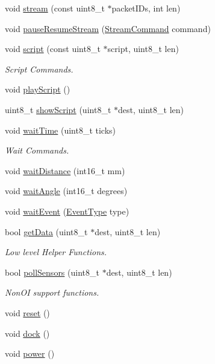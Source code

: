 \begin{DoxyCompactItemize}
void \hyperlink{class_arduino_roomba_a687c72eb69928dba45aa53aa39af2f1f}{stream} (const uint8\_\-t $\ast$packetIDs, int len)
\item 
void \hyperlink{class_arduino_roomba_af44bde5a03e64a53cd4198be8035741e}{pauseResumeStream} (\hyperlink{class_arduino_roomba_a80ef89fefa26336ed641673662ef4b6b}{StreamCommand} command)
\item 
void \hyperlink{class_arduino_roomba_a4d8122739d5e828f963f6e51ee4d101a}{script} (const uint8\_\-t $\ast$script, uint8\_\-t len)
\begin{DoxyCompactList}\small\item\em Script Commands. \item\end{DoxyCompactList}\item 
void \hyperlink{class_arduino_roomba_a8f5bd40d2d4c26a314f2ee649d7605ae}{playScript} ()
\item 
uint8\_\-t \hyperlink{class_arduino_roomba_a12e3789abd74c01eac4e1f094edc0f8d}{showScript} (uint8\_\-t $\ast$dest, uint8\_\-t len)
\item 
void \hyperlink{class_arduino_roomba_a6ddfe1cb8fee12458d00e80b9ef68a19}{waitTime} (uint8\_\-t ticks)
\begin{DoxyCompactList}\small\item\em Wait Commands. \item\end{DoxyCompactList}\item 
void \hyperlink{class_arduino_roomba_a80daa425563387fab74ede7351981861}{waitDistance} (int16\_\-t mm)
\item 
void \hyperlink{class_arduino_roomba_a5eecc857d2d010f7c3ebaa75044f6349}{waitAngle} (int16\_\-t degrees)
\item 
void \hyperlink{class_arduino_roomba_a857cfae908fbdc5c2dc87eecaf8e2b52}{waitEvent} (\hyperlink{class_arduino_roomba_af76e2cc5c85104aae809b49a9af59a9c}{EventType} type)
\item 
bool \hyperlink{class_arduino_roomba_a31c65b37a69092d98e86fbb8641d4c67}{getData} (uint8\_\-t $\ast$dest, uint8\_\-t len)
\begin{DoxyCompactList}\small\item\em Low level Helper Functions. \item\end{DoxyCompactList}\item 
bool \hyperlink{class_arduino_roomba_ac534f7f31042a034873264b6c0ebf0ad}{pollSensors} (uint8\_\-t $\ast$dest, uint8\_\-t len)
\begin{DoxyCompactList}\small\item\em NonOI support functions. \item\end{DoxyCompactList}\item 
void \hyperlink{class_arduino_roomba_a03f560265530b2dde866f111c547a271}{reset} ()
\item 
void \hyperlink{class_arduino_roomba_a36910b1173f76e1d09e3e2769ae07e5e}{dock} ()
\item 
void \hyperlink{class_arduino_roomba_af912edc527c77a7785861c061405c971}{power} ()
\end{DoxyCompactItemize}
